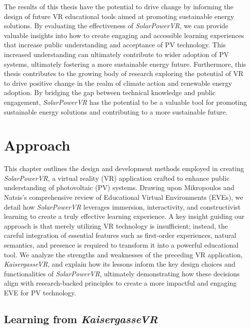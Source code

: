 \documentclass[draft, final]{vutinfth} %
\begin{document}
The results of this thesis have the potential to drive change by informing the design of future VR educational tools aimed at promoting sustainable energy solutions. By evaluating the effectiveness of \textit{SolarPowerVR}, we can provide valuable insights into how to create engaging and accessible learning experiences that increase public understanding and acceptance of PV technology. This increased understanding can ultimately contribute to wider adoption of PV systems, ultimately fostering a more sustainable energy future. Furthermore, this thesis contributes to the growing body of research exploring the potential of VR to drive positive change in the realm of climate action and renewable energy adoption. By bridging the gap between technical knowledge and public engagement, \textit{SolarPowerVR} has the potential to be a valuable tool for promoting sustainable energy solutions and contributing to a more sustainable future.

\chapter{Approach}

This chapter outlines the design and development methods employed in creating \textit{SolarPowerVR}, a virtual reality (VR) application crafted to enhance public understanding of photovoltaic (PV) systems. Drawing upon Mikropoulos and Natsis's \cite{Mikropoulos2011VrEducational} comprehensive review of Educational Virtual Environments (EVEs), we detail how \textit{SolarPowerVR} leverages immersion, interactivity, and constructivist learning to create a truly effective learning experience. A key insight guiding our approach is that merely utilizing VR technology is insufficient; instead, the careful integration of essential features such as first-order experiences, natural semantics, and presence is required to transform it into a powerful educational tool. We analyze the strengths and weaknesses of the preceding VR application, \textit{KaisergasseVR}, and explain how its lessons inform the key design choices and functionalities of \textit{SolarPowerVR}, ultimately demonstrating how these decisions align with research-backed principles to create a more impactful and engaging EVE for PV technology.

\section{Learning from \textit{KaisergasseVR}}
\end{document}
